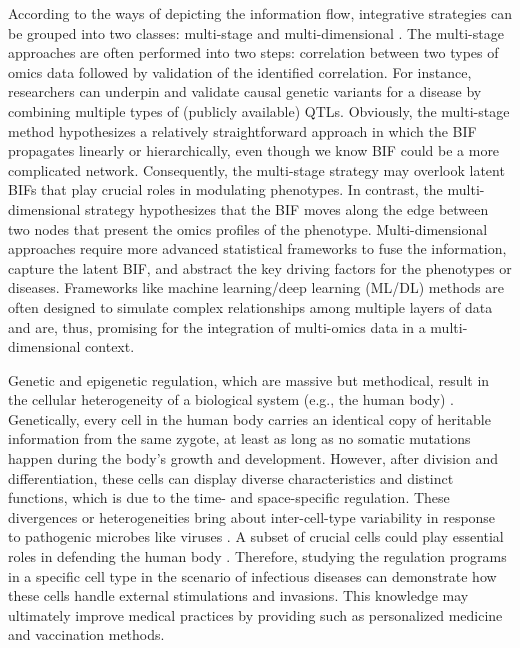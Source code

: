 \documentclass{book}
\begin{document}
\begin{refsection}
According to the ways of depicting the information flow, integrative strategies can be grouped into two classes: multi-stage and multi-dimensional \cite{Ritchie2015Methods}.
The multi-stage approaches are often performed into two steps: correlation between two types of omics data followed by validation of the identified correlation.
For instance, researchers can underpin and validate causal genetic variants for a disease by combining multiple types of (publicly available) QTLs.
Obviously, the multi-stage method hypothesizes a relatively straightforward approach in which the BIF propagates linearly or hierarchically, even though we know BIF could be a more complicated network.
Consequently, the multi-stage strategy may overlook latent BIFs that play crucial roles in modulating phenotypes.
In contrast, the multi-dimensional strategy hypothesizes that the BIF moves along the edge between two nodes that present the omics profiles of the phenotype.
Multi-dimensional approaches require more advanced statistical frameworks to fuse the information, capture the latent BIF, and abstract the key driving factors for the phenotypes or diseases.
Frameworks like machine learning/deep learning (ML/DL) methods are often designed to simulate complex relationships among multiple layers of data and are, thus, promising for the integration of multi-omics data in a multi-dimensional context.

Genetic and epigenetic regulation, which are massive but methodical, result in the cellular heterogeneity of a biological system (e.g., the human body) \cite{Komin2017How,Carter2020The}.
Genetically, every cell in the human body carries an identical copy of heritable information from the same zygote, at least as long as no somatic mutations happen during the body's growth and development.
However, after division and differentiation, these cells can display diverse characteristics and distinct functions, which is due to the time- and space-specific regulation.
These divergences or heterogeneities bring about inter-cell-type variability in response to pathogenic microbes like viruses \cite{Wilk2020A,Cai2020Single}.
A subset of crucial cells could play essential roles in defending the human body \cite{Cai2020Single}.
Therefore, studying the regulation programs in a specific cell type in the scenario of infectious diseases can demonstrate how these cells handle external stimulations and invasions.
This knowledge may ultimately improve medical practices by providing such as personalized medicine and vaccination methods.


\end{refsection}
\end{document}
